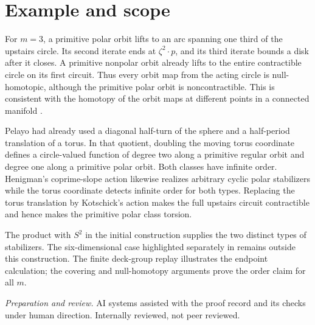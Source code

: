\documentclass[11pt]{amsart}
\begin{document}
\section{Example and scope}
For \(m=3\), a primitive polar orbit lifts to an arc spanning one third of the upstairs circle. Its second iterate ends at \(\zeta^2\cdot p\), and its third iterate bounds a disk after it closes. A primitive nonpolar orbit already lifts to the entire contractible circle on its first circuit. Thus every orbit map from the acting circle is null-homotopic, although the primitive polar orbit is noncontractible. This is consistent with the homotopy of the orbit maps at different points in a connected manifold \cite[Lemma 3.1]{HK}.

Pelayo \cite[Example~2.8]{Pelayo} had already used a diagonal half-turn of the sphere and a half-period translation of a torus. In that quotient, doubling the moving torus coordinate defines a circle-valued function of degree two along a primitive regular orbit and degree one along a primitive polar orbit. Both classes have infinite order. Henigman's coprime-slope action \cite[Appendix~A.1]{H} likewise realizes arbitrary cyclic polar stabilizers while the torus coordinate detects infinite order for both types. Replacing the torus translation by Kotschick's action makes the full upstairs circuit contractible and hence makes the primitive polar class torsion.

The product with \(S^2\) in the initial construction supplies the two distinct types of stabilizers. The six-dimensional case highlighted separately in \cite[Section 8.1]{HK} remains outside this construction. The finite deck-group replay illustrates the endpoint calculation; the covering and null-homotopy arguments prove the order claim for all \(m\).

\medskip
\noindent\textit{Preparation and review.}
AI systems assisted with the proof record and its checks under human direction. Internally reviewed, not peer reviewed.


\end{document}

